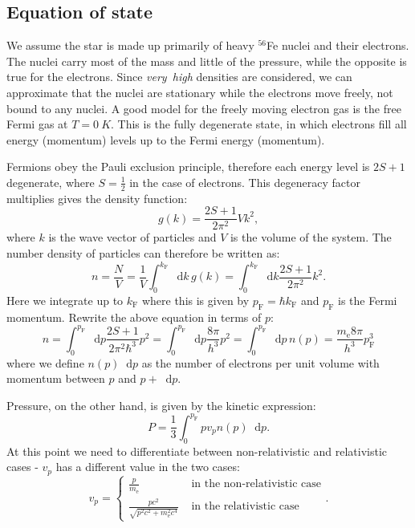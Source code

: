\documentclass[]{article}
\newcommand{\dd}{\mathop{}\!\mathrm{d}}
\newcommand{\fermiMtm}{p_\mathrm{F}}
\newcommand{\massElectron}{m_\mathrm{e}}
\begin{document}
\subsection{Equation of state}
	We assume the star is made up primarily of heavy $^{56}$Fe nuclei and their electrons. The nuclei carry most of the mass and little of the pressure, while the opposite is true for the electrons. Since \emph{very~high} densities are considered, we can approximate that the nuclei are stationary while the electrons move freely, not bound to any nuclei. A good model for the freely moving electron gas is the free Fermi gas at $T = \SI{0}{K}$. This is the fully degenerate state, in which electrons fill all energy (momentum) levels up to the Fermi energy (momentum).

	Fermions obey the Pauli exclusion principle, therefore each energy level is $2S + 1$ degenerate, where $S = \frac{1}{2}$ in the case of electrons. This degeneracy factor multiplies gives the density function:
	\begin{equation}
		g(k) = \frac{2S + 1}{2 \pi^2} V k^2,
	\end{equation}
	where $k$ is the wave vector of particles and $V$ is the volume of the system. The number density of particles can therefore be written as:
	\begin{equation}
		n = \frac{N}{V} = \frac{1}{V} \int_0^{k_\mathrm{F}} \dd k \, g(k) = \int_0^{k_\mathrm{F}} \dd k \frac{2S + 1}{2 \pi^2} k^2.
	\end{equation}
	Here we integrate up to $k_\mathrm{F}$ where this is given by $\fermiMtm = \hbar k_\mathrm{F}$ and $\fermiMtm$ is the Fermi momentum. Rewrite the above equation in terms of $p$:
	\begin{equation}\label{eqn:number-density}
		n = \int_0^{\fermiMtm} \dd p \frac{2S + 1}{2 \pi^2 \hbar^3} p^2 = \int_0^{\fermiMtm} \dd p \frac{8 \pi}{h^3} p^2 = \int_0^{\fermiMtm} \dd p \, n(p) = \frac{\massElectron8 \pi}{h^3} \fermiMtm^3
	\end{equation}
	where we define $n(p) \dd p$ as the number of electrons per unit volume with momentum between $p$ and $p + \dd p$.

	Pressure, on the other hand, is given by the kinetic expression:
	\begin{equation}\label{eqn:pressure-int}
		P = \frac{1}{3} \int_0^{\fermiMtm} p v_p n(p) \dd p.
	\end{equation}
	At this point we need to differentiate between non-relativistic and relativistic cases - $v_p$ has a different value in the two cases:
	\begin{equation}
		v_p = \begin{cases}
			\frac{p}{\massElectron} & \text{ in the non-relativistic case} \\
			\frac{pc^2}{\sqrt{p^2c^2 + \massElectron^2 c^4}} & \text{ in the relativistic case}
		\end{cases}.
	\end{equation}
\end{document}
